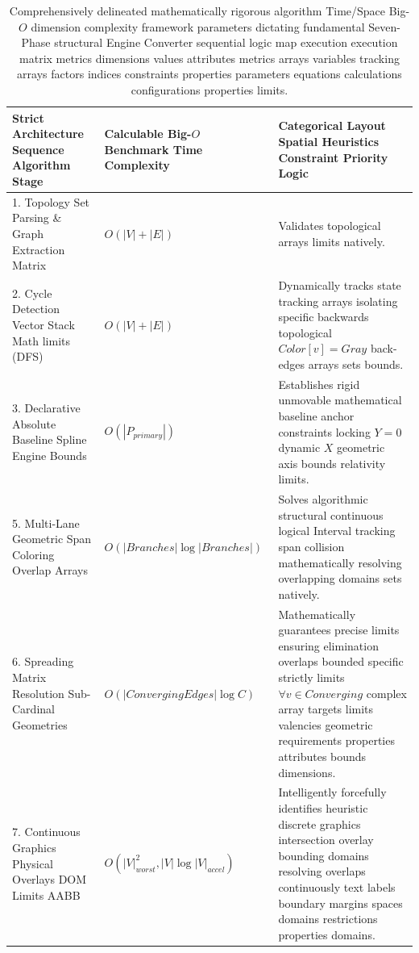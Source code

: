 \documentclass[fleqn,10pt]{wlscirep}
\begin{document}
\begin{table}[ht]
\centering
\begin{tabular}{|p{4.5cm}|p{4cm}|p{7.5cm}|}
\hline
\textbf{Strict Architecture Sequence Algorithm Stage} & \textbf{Calculable Big-$O$ Benchmark Time Complexity} & \textbf{Categorical Layout Spatial Heuristics Constraint Priority Logic} \\
\hline
1. Topology Set Parsing \& Graph Extraction Matrix & $O(|V| + |E|)$ & Validates topological arrays limits natively. \\
\hline
2. Cycle Detection Vector Stack Math limits (DFS) & $O(|V| + |E|)$ & Dynamically tracks state tracking arrays isolating specific backwards topological $Color[v] = Gray$ back-edges arrays sets bounds. \\
\hline
3. Declarative Absolute Baseline Spline Engine Bounds & $O(|P_{primary}|)$ & Establishes rigid unmovable mathematical baseline anchor constraints locking $Y=0$ dynamic $X$ geometric axis bounds relativity limits. \\
\hline
5. Multi-Lane Geometric Span Coloring Overlap Arrays & $O(|Branches| \log |Branches|)$ & Solves algorithmic structural continuous logical Interval tracking span collision mathematically resolving overlapping domains sets natively. \\
\hline
6. Spreading Matrix Resolution Sub-Cardinal Geometries & $O(|Converging Edges| \log C)$ & Mathematically guarantees precise limits ensuring elimination overlaps bounded specific strictly limits $\forall v \in Converging$ complex array targets limits valencies geometric requirements properties attributes bounds dimensions. \\
\hline
7. Continuous Graphics Physical Overlays DOM Limits AABB & $O(|V|^2_{worst}, |V| \log |V|_{accel})$ & Intelligently forcefully identifies heuristic discrete graphics intersection overlay bounding domains resolving overlaps continuously text labels boundary margins spaces domains restrictions properties domains. \\
\hline
\end{tabular}
\caption{\label{tab:complexity}Comprehensively delineated mathematically rigorous algorithm Time/Space Big-$O$ dimension complexity framework parameters dictating fundamental Seven-Phase structural Engine Converter sequential logic map execution execution matrix metrics dimensions values attributes metrics arrays variables tracking arrays factors indices constraints properties parameters equations calculations configurations properties limits.}
\end{table}
\end{document}
